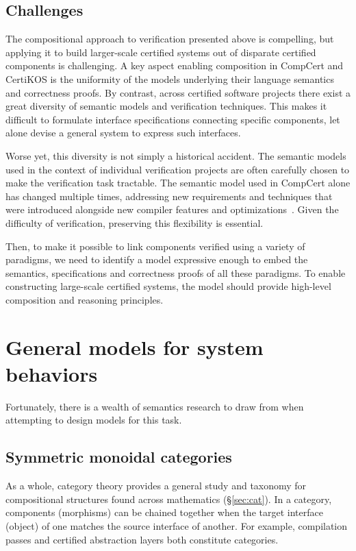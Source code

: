 \documentclass[draft,11pt]{report}
\theoremstyle{definition}
\begin{document}
\subsection{Challenges} %

The compositional approach to verification presented above is compelling,
but applying it to build larger-scale certified systems
out of disparate certified components
is challenging.
A key aspect enabling composition in CompCert and CertiKOS
is the uniformity of the models underlying
their language semantics and correctness proofs.
By contrast,
across certified software projects
there exist a great diversity
of semantic models and verification techniques.
This makes it difficult to formulate
interface specifications connecting specific components,
let alone devise a general system
to express such interfaces.

Worse yet,
this diversity is not simply a historical accident.
The semantic models
used in the context of individual verification projects
are often carefully chosen
to make the verification task tractable.
The semantic model used in CompCert alone
has changed multiple times,
addressing new requirements and techniques
that were introduced alongside
new compiler features and optimizations~\citep{compsem}.
Given the difficulty of verification,
preserving this flexibility is essential.

Then,
to make it possible to link components
verified using a variety of paradigms,
we need to identify a model
expressive enough to embed
the semantics, specifications and correctness proofs
of all these paradigms.
To enable constructing large-scale certified systems,
the model should provide
high-level composition and reasoning principles.



\section{General models for system behaviors} %
\label{ssec:genmodel}

Fortunately,
there is a wealth of semantics research to draw from
when attempting to design models for this task.

\subsection{Symmetric monoidal categories} %

As a whole,
category theory provides a general study
and taxonomy for
compositional structures found
across mathematics (\S\ref{sec:cat}).
In a category,
components (morphisms) can be chained together when
the target interface (object) of one matches
the source interface of another.
For example,
compilation passes and certified abstraction layers
both constitute categories.
\end{document}
